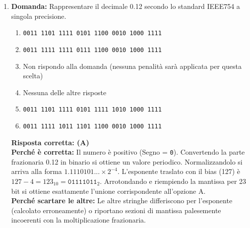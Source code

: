 \documentclass[12pt, a4paper]{article}
\begin{document}
\begin{enumerate}
    \item \textbf{Domanda:} Rappresentare il decimale 0.12 secondo lo standard IEEE754 a singola precisione.
    \begin{enumerate}[label=(\Alph*)]
        \item \texttt{0011 1101 1111 0101 1100 0010 1000 1111}
        \item \texttt{0011 1111 1111 0111 1100 0010 1000 1111}
        \item Non rispondo alla domanda (nessuna penalità sarà applicata per questa scelta)
        \item Nessuna delle altre risposte
        \item \texttt{0011 1101 1111 0101 1111 1010 1000 1111}
        \item \texttt{0011 1111 1011 1101 1100 0010 1000 1111}
    \end{enumerate}
    \textbf{Risposta corretta: (A)} \\
    \textbf{Perché è corretta:} Il numero è positivo (Segno = \texttt{0}). Convertendo la parte frazionaria 0.12 in binario si ottiene un valore periodico. Normalizzandolo si arriva alla forma $1.1110101... \times 2^{-4}$. L'esponente traslato con il bias (127) è $127 - 4 = 123_{10} = \texttt{01111011}_2$. Arrotondando e riempiendo la mantissa per 23 bit si ottiene esattamente l'unione corrispondente all'opzione A. \\
    \textbf{Perché scartare le altre:} Le altre stringhe differiscono per l'esponente (calcolato erroneamente) o riportano sezioni di mantissa palesemente incoerenti con la moltiplicazione frazionaria.
    

\end{enumerate}
\end{document}
